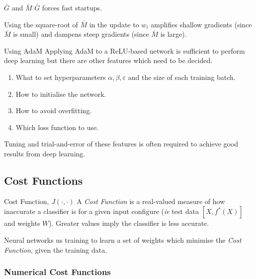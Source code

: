 \documentclass[11pt,a4paper]{article}
\begin{document}
  \begin{remark}{$\bar{G}$ and $\bar{M}$}
    $\bar{G}$ forces fast startups. %
    \par Using the square-root of $\bar{M}$ in the update to $w_i$ amplifies shallow gradients (since $\bar{M}$ is small) and dampens steep gradients (since $\bar{M}$ is large).
  \end{remark}

  \begin{remark}{Using AdaM}
    Applying AdaM to a ReLU-based network is sufficient to perform deep learning but there are other features which need to be decided.
    \begin{enumerate}
      \item What to set hyperparameters $\alpha,\beta,\varepsilon$ and the size of each training batch.
      \item How to initialise the network.
      \item How to avoid overfitting.
      \item Which loss function to use.
    \end{enumerate}
    Tuning and trial-and-error of these features is often required to achieve good results from deep learning.
  \end{remark}

\subsection{Cost Functions} \label{sec_CostFunctions}

  \begin{definition}{Cost Function, $J(\cdot,\cdot)$}
    A \textit{Cost Function} is a real-valued measure of how inaccurate a classifier is for a given input configure (\textit{ie} test data $[X,f^*(X)]$ and weights $W$). Greater values imply the classifier is less accurate.
    \par Neural networks us training to learn a set of weights which minimise the \textit{Cost Function}, given the training data.
  \end{definition}

\subsubsection{Numerical Cost Functions} \label{sec_NumericalCostFunctions}
\end{document}

